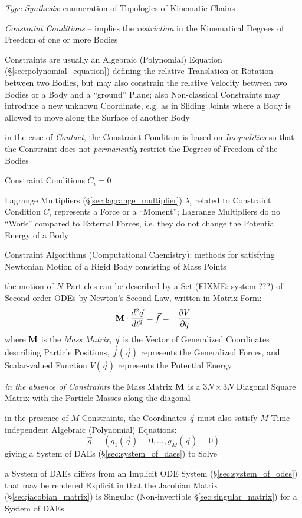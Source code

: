 \emph{Type Synthesis}: enumeration of Topologies of Kinematic Chains

\emph{Constraint Conditions} -- implies the \emph{restriction} in the
Kinematical Degrees of Freedom of one or more Bodies

Constraints are usually an Algebraic (Polynomial) Equation
(\S\ref{sec:polynomial_equation}) defining the relative Translation or Rotation
between two Bodies, but may also constrain the relative Velocity between two
Bodies or a Body and a ``ground'' Plane; also Non-classical Constraints may
introduce a new unknown Coordinate, e.g. as in Sliding Joints where a Body is
allowed to move along the Surface of another Body

in the case of \emph{Contact}, the Constraint Condition is based on
\emph{Inequalities} so that the Constraint does not \emph{permanently} restrict
the Degrees of Freedom of the Bodies

Constraint Conditions $C_i = 0$

Lagrange Multipliers (\S\ref{sec:lagrange_multiplier}) $\lambda_i$ related to
Constraint Condition $C_i$ represents a Force or a ``Moment''; Lagrange
Multipliers do no ``Work'' compared to External Forces, i.e. they do not change
the Potential Energy of a Body

Constraint Algorithms (Computational Chemistry): methods for satisfying
Newtonian Motion of a Rigid Body consisting of Mass Points

the motion of $N$ Particles can be described by a Set (FIXME: system ???) of
Second-order ODEs by Newton's Second Law, written in Matrix Form:
\[
  \mathbf{M} \cdot \frac{d^2\vec{q}}{dt^2}
    = \vec{f} = -\frac{\partial{V}}{\partial{q}}
\]
where $\mathbf{M}$ is the \emph{Mass Matrix}, $\vec{q}$ is the Vector of
Generalized Coordinates describing Particle Positions, $\vec{f}(\vec{q})$
represents the Generalized Forces, and Scalar-valued Function $V(\vec{q})$
represents the Potential Energy

\emph{in the absence of Constraints} the Mass Matrix $\mathbf{M}$ is a $3N \times
3N$ Diagonal Square Matrix with the Particle Masses along the diagonal

in the presence of $M$ Constraints, the Coordinates $\vec{q}$ must also satisfy
$M$ Time-independent Algebraic (Polynomial) Equations:
\[
  \vec{g} = (g_1(\vec{q}) = 0, \ldots, g_M(\vec{q}) = 0)
\]
giving a System of DAEs (\S\ref{sec:system_of_daes}) to Solve

\fist a System of DAEs differs from an Implicit ODE System
(\S\ref{sec:system_of_odes}) that may be rendered Explicit in that the Jacobian
Matrix (\S\ref{sec:jacobian_matrix}) is Singular (Non-invertible
\S\ref{sec:singular_matrix}) for a System of DAEs

